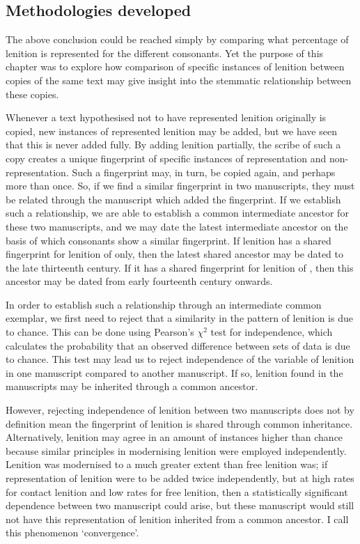 \subsection{Methodologies developed}
\label{sec:meth-devel}

The above conclusion could be reached simply by comparing what percentage of lenition is represented for the different consonants. Yet the purpose of this chapter was to explore how comparison of specific instances of lenition between copies of the same text may give insight into the stemmatic relationship between these copies.

Whenever a text hypothesised not to have represented lenition originally is copied, new instances of represented lenition may be added, but we have seen that this is never added fully. By adding lenition partially, the scribe of such a copy creates a unique fingerprint of specific instances of representation and non-representation. Such a fingerprint may, in turn, be copied again, and perhaps more than once. So, if we find a similar fingerprint in two manuscripts, they must be related through the manuscript which added the fingerprint. If we establish such a relationship, we are able to establish a common intermediate ancestor for these two manuscripts, and we may date the latest intermediate ancestor on the basis of which consonants show a similar fingerprint. If lenition has a shared fingerprint for lenition of  only, then the latest shared ancestor may be dated to the late thirteenth century. If it has a shared fingerprint for lenition of , then this ancestor may be dated from early fourteenth century onwards.

In order to establish such a relationship through an intermediate common exemplar, we first need to reject that a similarity in the pattern of lenition is due to chance. This can be done using Pearson's \(\chi^2\) test for independence, which calculates the probability that an observed difference between sets of data is due to chance. This test may lead us to reject independence of the variable of lenition in one manuscript compared to another manuscript. If so, lenition found in the manuscripts may be inherited through a common ancestor.

However, rejecting independence of lenition between two manuscripts does not by definition mean the fingerprint of lenition is shared through common inheritance. Alternatively, lenition may agree in an amount of instances higher than chance because similar principles in modernising lenition were employed independently. Lenition was modernised to a much greater extent than free lenition was; if representation of lenition were to be added twice independently, but at high rates for contact lenition and low rates for free lenition, then a statistically significant dependence between two manuscript could arise, but these manuscript would still not have this representation of lenition inherited from a common ancestor. I call this phenomenon `convergence'.

